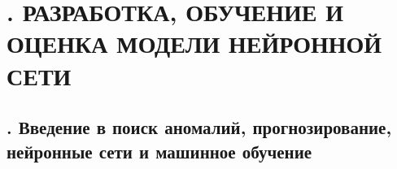 \setcounter{chaptercntr}{4}


\sectionbreak \section*{
  \gostTitleFont
  \redline
  \thechaptercntr .
   РАЗРАБОТКА, ОБУЧЕНИЕ И ОЦЕНКА МОДЕЛИ НЕЙРОННОЙ СЕТИ
}

\titlespace

\subsection*{ 
	\gostTitleFont
	\redline
	\thechaptercntr .\thesubchaptercntr \spc
	Введение в поиск аномалий, прогнозирование, нейронные сети и \newline \phantom{..................}
	 машинное обучение
} \addtocounter{subchaptercntr}{1}

\subtitlespace

